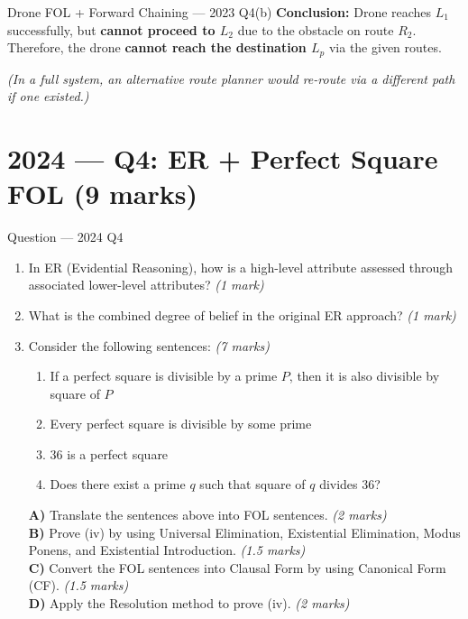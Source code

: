 \documentclass[12pt,a4paper]{article}
\begin{document}
\begin{solbox}{Drone FOL + Forward Chaining --- 2023 Q4(b)}
\textbf{Conclusion:} Drone reaches $L_1$ successfully, but \textbf{cannot proceed to $L_2$} due to the obstacle on route $R_2$. Therefore, the drone \textbf{cannot reach the destination $L_p$} via the given routes.

\medskip
\textit{(In a full system, an alternative route planner would re-route via a different path if one existed.)}
\end{solbox}

\newpage
\section{2024 --- Q4: ER + Perfect Square FOL (9 marks)}

\begin{qbox}{Question --- 2024 Q4}
\begin{enumerate}[label=(\alph*),noitemsep]
  \item In ER (Evidential Reasoning), how is a high-level attribute assessed through associated lower-level attributes? \hfill\textit{(1 mark)}
  \item What is the combined degree of belief in the original ER approach? \hfill\textit{(1 mark)}
  \item Consider the following sentences: \hfill\textit{(7 marks)}
    \begin{enumerate}[label=(\roman*),noitemsep]
      \item If a perfect square is divisible by a prime $P$, then it is also divisible by square of $P$
      \item Every perfect square is divisible by some prime
      \item 36 is a perfect square
      \item Does there exist a prime $q$ such that square of $q$ divides 36?
    \end{enumerate}
    \textbf{A)} Translate the sentences above into FOL sentences. \hfill\textit{(2 marks)}\\
    \textbf{B)} Prove (iv) by using Universal Elimination, Existential Elimination, Modus Ponens, and Existential Introduction. \hfill\textit{(1.5 marks)}\\
    \textbf{C)} Convert the FOL sentences into Clausal Form by using Canonical Form (CF). \hfill\textit{(1.5 marks)}\\
    \textbf{D)} Apply the Resolution method to prove (iv). \hfill\textit{(2 marks)}
\end{enumerate}
\end{qbox}
\end{document}
